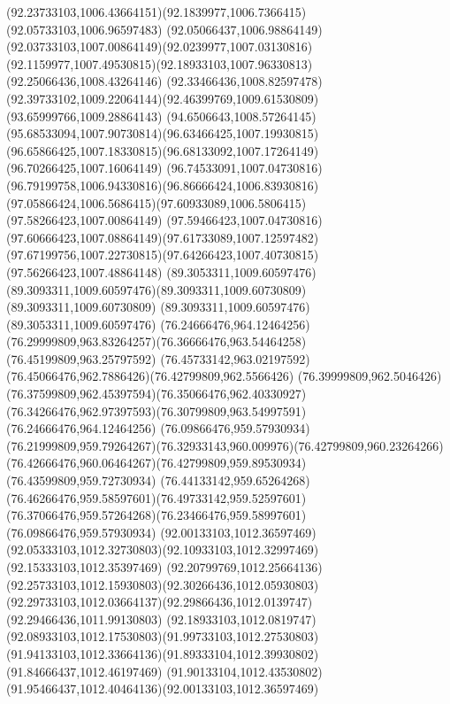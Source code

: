 {{		\curveto(92.23733103,1006.43664151)(92.1839977,1006.7366415)(92.05733103,1006.96597483)
		\curveto(92.05066437,1006.98864149)(92.03733103,1007.00864149)(92.0239977,1007.03130816)
		\curveto(92.1159977,1007.49530815)(92.18933103,1007.96330813)(92.25066436,1008.43264146)
		\curveto(92.33466436,1008.82597478)(92.39733102,1009.22064144)(92.46399769,1009.61530809)
		\lineto(93.65999766,1009.28864143)
		\curveto(94.6506643,1008.57264145)(95.68533094,1007.90730814)(96.63466425,1007.19930815)
		\curveto(96.65866425,1007.18330815)(96.68133092,1007.17264149)(96.70266425,1007.16064149)
		\curveto(96.74533091,1007.04730816)(96.79199758,1006.94330816)(96.86666424,1006.83930816)
		\curveto(97.05866424,1006.5686415)(97.60933089,1006.5806415)(97.58266423,1007.00864149)
		\curveto(97.59466423,1007.04730816)(97.60666423,1007.08864149)(97.61733089,1007.12597482)
		\curveto(97.67199756,1007.22730815)(97.64266423,1007.40730815)(97.56266423,1007.48864148)
		\moveto(89.3053311,1009.60597476)
		\curveto(89.3093311,1009.60597476)(89.3093311,1009.60730809)(89.3093311,1009.60730809)
		\lineto(89.3093311,1009.60597476)
		\lineto(89.3053311,1009.60597476)
		\moveto(76.24666476,964.12464256)
		\curveto(76.29999809,963.83264257)(76.36666476,963.54464258)(76.45199809,963.25797592)
		\curveto(76.45733142,963.02197592)(76.45066476,962.7886426)(76.42799809,962.5566426)
		\curveto(76.39999809,962.5046426)(76.37599809,962.45397594)(76.35066476,962.40330927)
		\curveto(76.34266476,962.97397593)(76.30799809,963.54997591)(76.24666476,964.12464256)
		\moveto(76.09866476,959.57930934)
		\curveto(76.21999809,959.79264267)(76.32933143,960.009976)(76.42799809,960.23264266)
		\curveto(76.42666476,960.06464267)(76.42799809,959.89530934)(76.43599809,959.72730934)
		\curveto(76.44133142,959.65264268)(76.46266476,959.58597601)(76.49733142,959.52597601)
		\curveto(76.37066476,959.57264268)(76.23466476,959.58997601)(76.09866476,959.57930934)
		\moveto(92.00133103,1012.36597469)
		\curveto(92.05333103,1012.32730803)(92.10933103,1012.32997469)(92.15333103,1012.35397469)
		\curveto(92.20799769,1012.25664136)(92.25733103,1012.15930803)(92.30266436,1012.05930803)
		\curveto(92.29733103,1012.03664137)(92.29866436,1012.0139747)(92.29466436,1011.99130803)
		\curveto(92.18933103,1012.0819747)(92.08933103,1012.17530803)(91.99733103,1012.27530803)
		\curveto(91.94133103,1012.33664136)(91.89333104,1012.39930802)(91.84666437,1012.46197469)
		\curveto(91.90133104,1012.43530802)(91.95466437,1012.40464136)(92.00133103,1012.36597469)
	}
}
